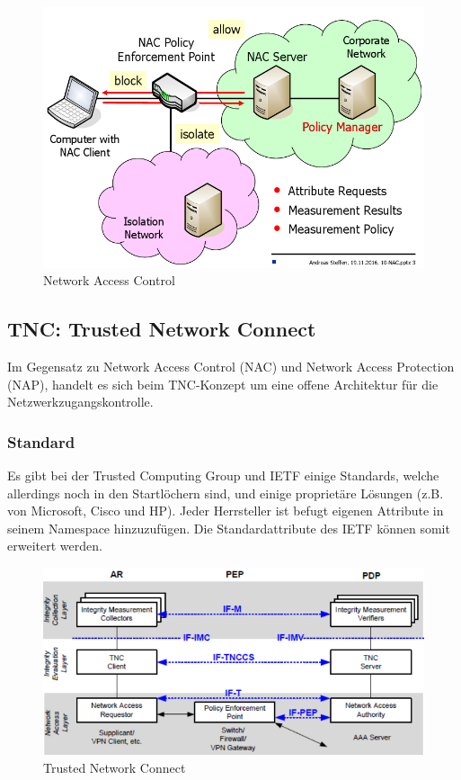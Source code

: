 \begin{figure}[h!]
\centering
\includegraphics[width=0.7\linewidth]{images/network_access_control}
\caption{Network Access Control}
\label{fig:networkaccesscontrol}
\end{figure}

\clearpage

\subsection{TNC: Trusted Network Connect}
Im Gegensatz zu Network Access Control (NAC) und Network Access Protection (NAP), handelt es sich beim TNC-Konzept um eine offene Architektur für die Netzwerkzugangskontrolle. 
\subsubsection{Standard}
Es gibt bei der Trusted Computing Group und IETF einige Standards, welche allerdings noch in den Startlöchern sind, und einige proprietäre Lösungen (z.B. von Microsoft, Cisco und HP). Jeder Herrsteller ist befugt eigenen Attribute in seinem Namespace hinzuzufügen. Die Standardattribute des IETF können somit erweitert werden.


\begin{figure}[h!]
	\centering
	\includegraphics[width=0.7\linewidth]{images/nac_trusted_network_connect}
	\caption{Trusted Network Connect}
	\label{fig:nactrustednetworkconnect}
\end{figure}

